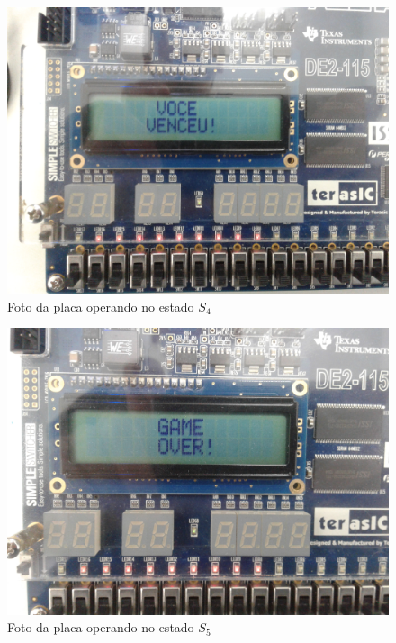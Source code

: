 \documentclass[14pt, oneside]{book}
\theoremstyle{definition}
\begin{document}
                 \begin{figure}[H]
                    \centering
                    \includegraphics[scale=0.14]{foto_placa_vocevenceu.jpg}
                    \caption{Foto da placa operando no estado $S_4$}
                    \label{voce venceu}
                \end{figure}
                
                 \begin{figure}[H]
                    \centering
                    \includegraphics[scale=0.14]{foto_placa_gameover.jpg}
                    \caption{Foto da placa operando no estado $S_5$}
                    \label{game over}
                \end{figure}
                
\end{document}
